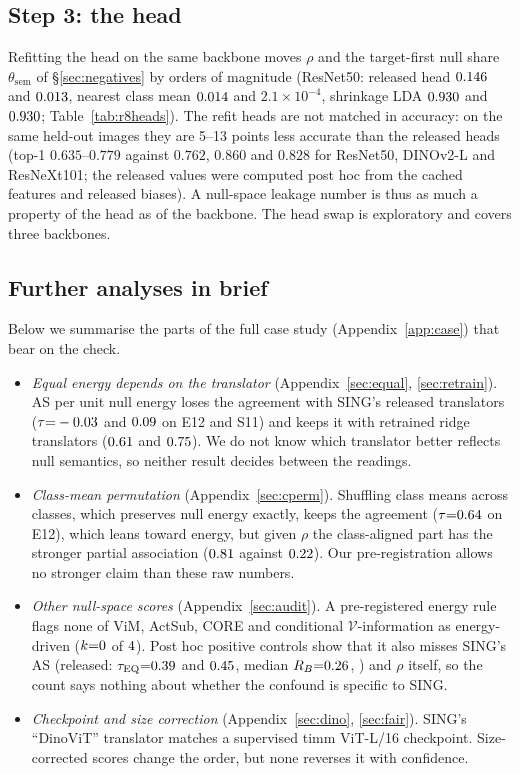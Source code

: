 \documentclass[10pt]{article}
\begin{document}
\subsection{Step 3: the head}
\label{sec:head}
Refitting the head on the same backbone moves $\rho$ and the target-first null share $\theta_{\mathrm{sem}}$ of \S\ref{sec:negatives} by orders of magnitude (ResNet50: released head $0.146$ and $0.013$, nearest class mean $0.014$ and $2.1{\times}10^{-4}$, shrinkage LDA $0.930$ and $0.930$; Table~\ref{tab:r8heads}). The refit heads are not matched in accuracy: on the same held-out images they are 5--13 points less accurate than the released heads (top-1 $0.635$--$0.779$ against $0.762$, $0.860$ and $0.828$ for ResNet50, DINOv2-L and ResNeXt101; the released values were computed post hoc from the cached features and released biases). A null-space leakage number is thus as much a property of the head as of the backbone.
The head swap is exploratory and covers three backbones.

\subsection{Further analyses in brief}
\label{sec:brief}
Below we summarise the parts of the full case study (Appendix~\ref{app:case}) that bear on the check.
\begin{itemize}
\item \emph{Equal energy depends on the translator} (Appendix~\ref{sec:equal}, \ref{sec:retrain}). AS per unit null energy loses the agreement with SING's released translators ($\tau{=}-0.03$ and $0.09$ on E12 and S11) and keeps it with retrained ridge translators ($0.61$ and $0.75$). We do not know which translator better reflects null semantics, so neither result decides between the readings.
\item \emph{Class-mean permutation} (Appendix~\ref{sec:cperm}). Shuffling class means across classes, which preserves null energy exactly, keeps the agreement ($\tau{=}0.64$ on E12), which leans toward energy, but given $\rho$ the class-aligned part has the stronger partial association ($0.81$ against $0.22$). Our pre-registration allows no stronger claim than these raw numbers.
\item \emph{Other null-space scores} (Appendix~\ref{sec:audit}). A pre-registered energy rule flags none of ViM, ActSub, CORE and conditional $\mathcal{V}$-information as energy-driven ($k{=}0$ of $4$). Post hoc positive controls show that it also misses SING's AS (released: $\tau_{\mathrm{EQ}}{=}0.39$ and $0.45$, median $R_B{=}0.26$, \RPASrelVerdict) and $\rho$ itself, so the count says nothing about whether the confound is specific to SING.
\item \emph{Checkpoint and size correction} (Appendix~\ref{sec:dino}, \ref{sec:fair}). SING's ``DinoViT'' translator matches a supervised timm ViT-L/16 checkpoint. Size-corrected scores change the order, but none reverses it with confidence.
\end{itemize}
\end{document}
